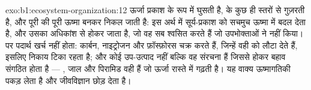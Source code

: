 \begin{solution}{exo:b1:ecosystem-organization:12}
ऊर्जा प्रकाश के रूप में घुसती है,  के कुछ ही स्तरों से गुज़रती है,
और पूरी की पूरी ऊष्मा बनकर निकल जाती है: इस अर्थ में 
सूर्य-प्रकाश को सचमुच ऊष्मा में बदल देता है, और उसका अधिकांश  से
होकर जाता है, जो वह सब श्वसित करते हैं जो उपभोक्ताओं ने नहीं किया। पर
पदार्थ खर्च नहीं होता: कार्बन, नाइट्रोजन और फ़ॉस्फ़ोरस चक्र करते हैं,
जिन्हें वही   को लौटा देते हैं, इसलिए निकाय टिका रहता है;
और  कोई उप-उत्पाद नहीं बल्कि वह संरचना हैं जिससे होकर बहाव
संगठित होता है --- , जाल और पिरामिड वही हैं जो ऊर्जा रास्ते
में गढ़ती है। यह वाक्य ऊष्मागतिकी पकड़ लेता है
और जीवविज्ञान छोड़ देता है।
\end{solution}

